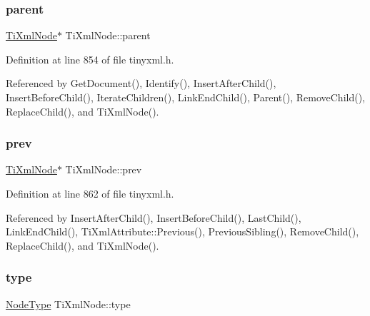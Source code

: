\hypertarget{class_ti_xml_node_a662c4de61244e4fa5bd4e2d8c63143a5}{}\label{class_ti_xml_node_a662c4de61244e4fa5bd4e2d8c63143a5} 
\subsubsection{\texorpdfstring{parent}{parent}}
{\footnotesize\ttfamily \hyperlink{class_ti_xml_node}{Ti\+Xml\+Node}$\ast$ Ti\+Xml\+Node\+::parent\hspace{0.3cm}{\ttfamily [protected]}}



Definition at line 854 of file tinyxml.\+h.



Referenced by Get\+Document(), Identify(), Insert\+After\+Child(), Insert\+Before\+Child(), Iterate\+Children(), Link\+End\+Child(), Parent(), Remove\+Child(), Replace\+Child(), and Ti\+Xml\+Node().

\hypertarget{class_ti_xml_node_a9c5370ea2cbfd9f0e0f7b30a57fd68f5}{}\label{class_ti_xml_node_a9c5370ea2cbfd9f0e0f7b30a57fd68f5} 
\subsubsection{\texorpdfstring{prev}{prev}}
{\footnotesize\ttfamily \hyperlink{class_ti_xml_node}{Ti\+Xml\+Node}$\ast$ Ti\+Xml\+Node\+::prev\hspace{0.3cm}{\ttfamily [protected]}}



Definition at line 862 of file tinyxml.\+h.



Referenced by Insert\+After\+Child(), Insert\+Before\+Child(), Last\+Child(), Link\+End\+Child(), Ti\+Xml\+Attribute\+::\+Previous(), Previous\+Sibling(), Remove\+Child(), Replace\+Child(), and Ti\+Xml\+Node().

\hypertarget{class_ti_xml_node_a2619c6379181c16ba95ae6922e2ca839}{}\label{class_ti_xml_node_a2619c6379181c16ba95ae6922e2ca839} 
\subsubsection{\texorpdfstring{type}{type}}
{\footnotesize\ttfamily \hyperlink{class_ti_xml_node_a836eded4920ab9e9ef28496f48cd95a2}{Node\+Type} Ti\+Xml\+Node\+::type\hspace{0.3cm}{\ttfamily [protected]}}



